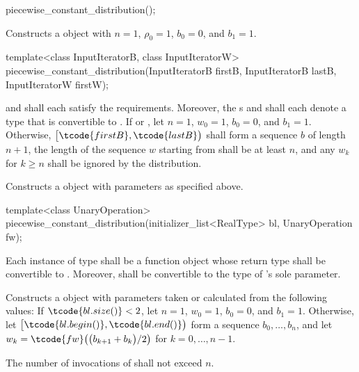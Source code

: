 %
\begin{itemdecl}
piecewise_constant_distribution();
\end{itemdecl}

\begin{itemdescr}
\pnum\effects Constructs a  object
 with $n = 1$,
 $\rho_0 = 1$,
 $b_0 = 0$,
 and $b_1 = 1$.
\end{itemdescr}


%
\begin{itemdecl}
template<class InputIteratorB, class InputIteratorW>
 piecewise_constant_distribution(InputIteratorB firstB, InputIteratorB lastB,
                                 InputIteratorW firstW);
\end{itemdecl}

\begin{itemdescr}
\pnum\requires
   and 
  shall each satisfy the
   requirements.
  Moreover,
  the s
   and
  shall each denote a type that is convertible to .
 If 
 or ,
 let $n = 1$,
     $w_0 = 1$,
     $b_0 = 0$,
 and $b_1 = 1$.
 Otherwise,
 $\bigl[\tcode{firstB}, \tcode{lastB}\bigr)$
 shall form a sequence $b$ of length $n+1$,
 the length of the sequence $w$ starting from 
 shall be at least $n$,
 and any $w_k$ for  $k \geq n$ shall be ignored by the distribution.

\pnum\effects Constructs a  object
 with parameters as specified above.
\end{itemdescr}


%
\begin{itemdecl}
template<class UnaryOperation>
 piecewise_constant_distribution(initializer_list<RealType> bl, UnaryOperation fw);
\end{itemdecl}

\begin{itemdescr}
\pnum\requires
 Each instance of type 
 shall be a function object
 whose return type shall be convertible to .
 Moreover,
  shall be convertible
 to the type of 's sole parameter.

\pnum\effects Constructs a  object
 with parameters taken or calculated
 from the following values:
 If $\tcode{bl.size()} < 2$,
 let $n = 1$,
     $w_0 = 1$,
     $b_0 = 0$,
 and $b_1 = 1$.
 Otherwise,
 let $\bigl[\tcode{bl.begin()}, \tcode{bl.end()}\bigr)$
 form a sequence $b_0, \dotsc, b_n$,
 and
 let $w_k = \tcode{fw}\bigl(\bigl(b_{k+1} + b_k\bigr) / 2\bigr)$
 for $k = 0, \dotsc, n - 1$.

\pnum\complexity
 The number of invocations of  shall not exceed $n$.
\end{itemdescr}


